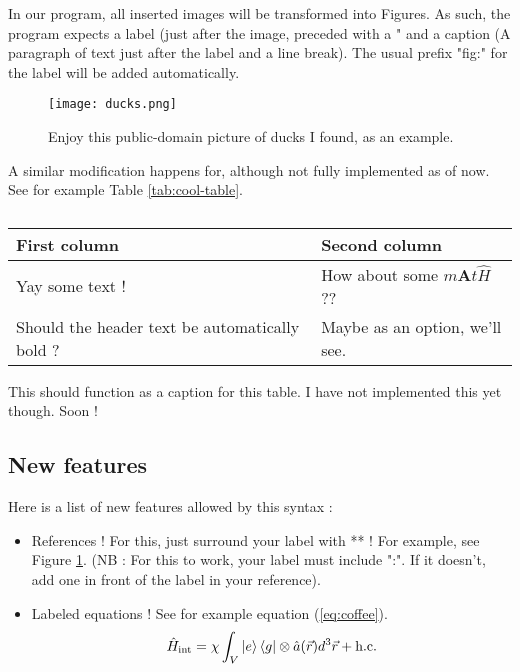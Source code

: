 \documentclass{article}
\begin{document}
\begin{maincontent}
In our program, all inserted images will be transformed into Figures. As such, the program expects a label (just after the image, preceded with a "\label{"),} and a caption (A paragraph of text just after the label and a line break). The usual prefix "fig:" for the label will be added automatically.


\begin{figure}
    \centering
    \texttt{[image: ducks.png]}
    \caption{Enjoy this public-domain picture of ducks I found, as an example.}
    \label{fig:ducks}
\end{figure}
        

A similar modification happens for, although not fully implemented as of now. See for example Table \ref{tab:cool-table}.

\begin{table}
    \centering
    \begin{tabular}{l|l}
First column & Second column \\
\hline
Yay some text ! & How about some $m\mathbf{A}t\hat{H}$ ?? \\
Should the header text be automatically bold ? & Maybe as an option, we'll see. \\

\end{tabular}

    \caption{}
    \label{tab:}
\end{table}
        
\label{cool-table}
This should function as a caption for this table. I have not implemented this yet though. Soon !

\subsection{New features}

Here is a list of new features allowed by this syntax :
\begin{itemize}
\item 
References ! For this, just surround your label with ** ! For example, see Figure \ref{fig:ducks}. (NB : For this to work, your label must include ":". If it doesn't, add one in front of the label in your reference).

\item 
Labeled equations ! See for example equation (\ref{eq:coffee}).\begin{equation}
	\hat{H}_{\text{int}}=\chi\int _{V}\ket{e} \bra{g} \otimes \hat{a}(\vec{r})d^{3}\vec{r}+\text{h.c.}
\label{eq:coffee}\end{equation}



\end{itemize}
\end{maincontent}
\end{document}
